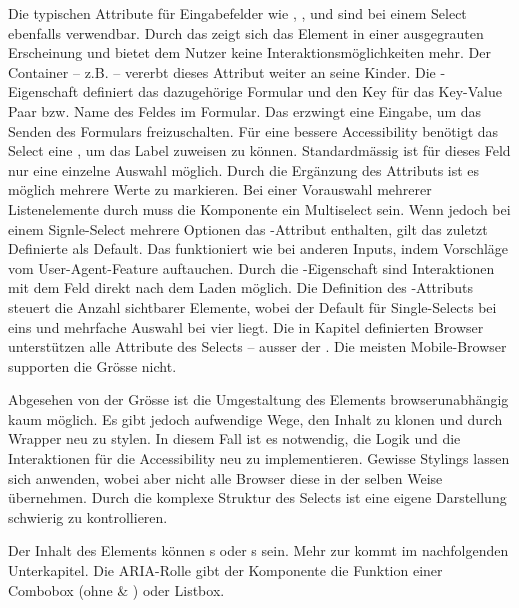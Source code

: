 Die typischen Attribute für Eingabefelder wie , ,  und  sind bei einem Select ebenfalls verwendbar. 
Durch das  zeigt sich das Element in einer ausgegrauten Erscheinung und bietet dem Nutzer keine Interaktionsmöglichkeiten mehr. 
Der Container – z.B.  – vererbt dieses Attribut weiter an seine Kinder. 
Die -Eigenschaft definiert das dazugehörige Formular und  den Key für das Key-Value Paar bzw. Name des Feldes im Formular. 
Das  erzwingt eine Eingabe, um das Senden des Formulars freizuschalten. 
Für eine bessere Accessibility benötigt das Select eine , um das Label zuweisen zu können. 
Standardmässig ist für dieses Feld nur eine einzelne Auswahl möglich. 
Durch die Ergänzung des Attributs  ist es möglich mehrere Werte zu markieren. 
Bei einer Vorauswahl mehrerer Listenelemente durch  muss die Komponente ein Multiselect sein. 
Wenn jedoch bei einem Signle-Select mehrere Optionen das -Attribut enthalten, gilt das zuletzt Definierte als Default. 
Das  funktioniert wie bei anderen Inputs, indem Vorschläge vom User-Agent-Feature auftauchen. 
Durch die -Eigenschaft sind Interaktionen mit dem Feld direkt nach dem Laden möglich. 
Die Definition des -Attributs steuert die Anzahl sichtbarer Elemente, wobei der Default für Single-Selects bei eins und mehrfache Auswahl bei vier liegt. 
Die in Kapitel \textbf{} definierten Browser unterstützen alle Attribute des Selects – ausser der . 
Die meisten Mobile-Browser supporten die Grösse nicht. 

Abgesehen von der Grösse ist die Umgestaltung des Elements browserunabhängig kaum möglich. 
Es gibt jedoch aufwendige Wege, den Inhalt zu klonen und durch Wrapper neu zu stylen. 
In diesem Fall ist es notwendig, die Logik und die Interaktionen für die Accessibility neu zu implementieren. 
Gewisse Stylings lassen sich anwenden, wobei aber nicht alle Browser diese in der selben Weise übernehmen. 
Durch die komplexe Struktur des Selects ist eine eigene Darstellung schwierig zu kontrollieren. 

Der Inhalt des Elements können s oder s sein. 
Mehr zur  kommt im nachfolgenden Unterkapitel. 
Die ARIA-Rolle gibt der Komponente die Funktion einer Combobox (ohne  \& ) oder Listbox. 

